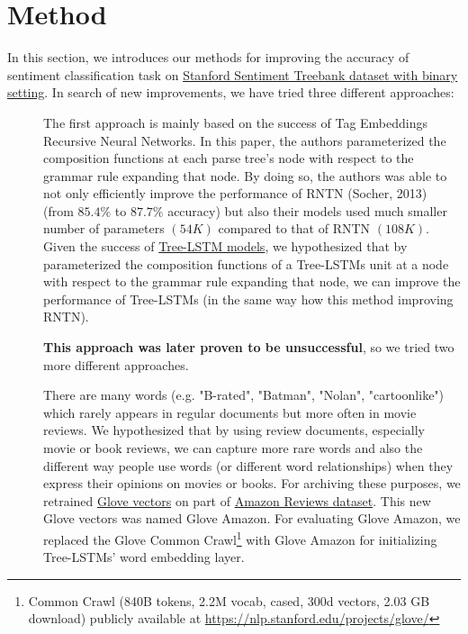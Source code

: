 \hypertarget{chap:method}{\chapter{Method}}\label{method}
In this section, we introduces our methods for improving the accuracy of sentiment classification task on \hyperref[sec:sst]{Stanford Sentiment Treebank dataset with binary setting}.
In search of new improvements, we have tried three different approaches:
\begin{description}
\item[] The first approach is mainly based on the success of Tag Embeddings Recursive Neural Networks\cite{tag-embedding-rnn}.
In this paper, the authors parameterized the composition functions at each parse tree's node with respect to the grammar rule expanding that node. 
By doing so, the authors was able to not only efficiently improve the performance of RNTN (Socher, 2013)\cite{socher2013recursive} (from \(85.4\%\) to \(87.7\%\) accuracy) but also their models used much smaller number of parameters \((54K)\) compared to that of RNTN \((108K)\)\cite{tag-embedding-rnn}.
Given the success of \hyperref[sec:treelstm]{Tree-LSTM models}, we hypothesized that by parameterized the composition functions of a Tree-LSTMs unit at a node with respect to the grammar rule expanding that node, we can improve the performance of Tree-LSTMs (in the same way how this method improving RNTN).

\textbf{This approach was later proven to be unsuccessful}, so we tried two more different approaches.

\item[] There are many words (e.g. "B-rated", "Batman", "Nolan", "cartoonlike") which rarely appears in regular documents but more often in movie reviews.
We hypothesized that by using review documents, especially movie or book reviews, we can capture more rare words and also the different way people use words (or different word relationships) when they express their opinions on movies or books.
For archiving these purposes, we retrained \hyperref[sec:glove]{Glove vectors} on part of  \hyperref[sec:amazon]{Amazon Reviews dataset}.
This new Glove vectors was named Glove Amazon.
For evaluating Glove Amazon, we replaced the Glove Common Crawl\footnote{Common Crawl (840B tokens, 2.2M vocab, cased, 300d vectors, 2.03 GB download) publicly available at \url{https://nlp.stanford.edu/projects/glove/}} with Glove Amazon for initializing Tree-LSTMs' word embedding layer.


\end{description}
